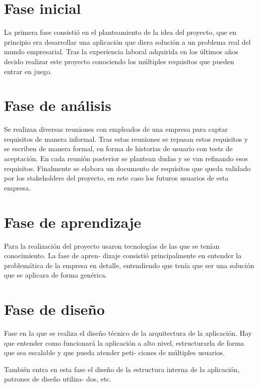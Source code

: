 \documentclass[12pt,a4paperpaper,]{report}
\begin{document}
\section{Fase inicial}\label{fase-inicial}

La primera fase consistió en el planteamiento de la idea del proyecto,
que en principio era desarrollar una aplicación que diera solución a un
problema real del mundo empresarial. Tras la experiencia laboral
adquirida en los últimos años decido realizar este proyecto conociendo
los múltiples requisitos que pueden entrar en juego.

\section{Fase de análisis}\label{fase-de-anuxe1lisis}

Se realizan diversas reuniones con empleados de una empresa para captar
requisitos de manera informal. Tras estas reuniones se repasan estos
requisitos y se escriben de manera formal, en forma de historias de
usuario con tests de aceptación. En cada reunión posterior se plantean
dudas y se van refinando esos requisitos. Finalmente se elabora un
documento de requisitos que queda validado por los stakeholders del
proyecto, en este caso los futuros usuarios de esta empresa.

\section{Fase de aprendizaje}\label{fase-de-aprendizaje}

Para la realización del proyecto usaron tecnologías de las que se tenían
conocimiento. La fase de apren- dizaje consistió principalmente en
entender la problemática de la empresa en detalle, entendiendo que tenía
que ser una solución que se aplicara de forma genérica.

\section{Fase de diseño}\label{fase-de-diseuxf1o}

Fase en la que se realiza el diseño técnico de la arquitectura de la
aplicación. Hay que entender como funcionará la aplicación a alto nivel,
estructurarla de forma que sea escalable y que pueda atender peti-
ciones de múltiples usuarios.

También entra en esta fase el diseño de la estructura interna de la
aplicación, patrones de diseño utiliza- dos, etc.
\end{document}
